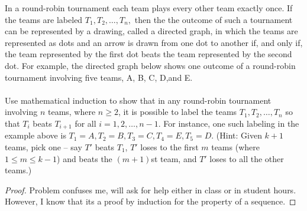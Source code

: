 \documentclass[name=Ojas\ Chaturvedi, emailid=oj.chaturvedi.2024, course=Capstone:\ Discrete\ Math, num=8, deadline={November\ 2,\ 2023}]{homework}
\begin{document}
In a round-robin tournament each team plays every other team exactly once. If the teams are labeled $T_1, T_2, \ldots, T_n,$ then the the outcome of such a tournament can be represented by a drawing, called a directed graph, in which the teams are represented as dots and an arrow is drawn from one dot to another if, and only if, the team represented by the ﬁrst dot beats the team represented by the second dot. For example, the directed graph below shows one outcome of a round-robin tournament involving ﬁve teams, A, B, C, D,and E. \\ \\
Use mathematical induction to show that in any round-robin tournament involving $n$ teams, where $n \geq 2$, it is possible to label the teams $T_1, T_2, \ldots, T_n$ so that $T_i$ beats $T_{i+1}$ for all $i = 1, 2, \ldots, n-1$. For instance, one such labeling in the example above is $T_1 = A, T_2 = B, T_3 = C, T_4 = E, T_5 = D$. (Hint: Given $k+1$ teams, pick one -- say $T'$ beats $T_1$, $T'$ loses to the first $m$ teams (where $1 \leq m \leq k-1$) and beats the $(m+1)$st team, and $T'$ loses to all the other teams.)
\begin{proof}
    Problem confuses me, will ask for help either in class or in student hours. However, I know that its a proof by induction for the property of a sequence.
\end{proof}
\end{document}
